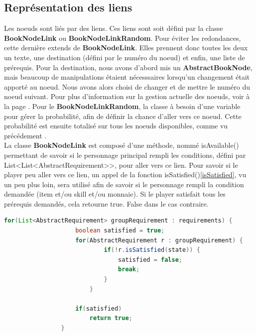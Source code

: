 		\subsection{Représentation des liens}
			Les noeuds sont liés par des liens. Ces liens sont soit défini par la classe \textbf{BookNodeLink} ou \textbf{BookNodeLinkRandom}. Pour éviter les redondances, cette dernière extends de \textbf{BookNodeLink}. Elles prennent donc toutes les deux un texte, une destination (défini par le numéro du noeud) et enfin, une liste de prérequis.  Pour la destination, nous avons d'abord mis un \textbf{AbstractBookNode}, mais beaucoup de manipulations étaient nécesssaires lorsqu'un changement était apporté au noeud. Nous avons alors choisi de changer et de mettre le numéro du noeud suivant. Pour plus d'information sur la gestion actuelle des noeuds, voir  à la page \pageref{book}.
			Pour le \textbf{BookNodeLinkRandom}, la classe à besoin d'une variable pour gérer la probabilité, afin de définir la chance d'aller vers ce noeud. Cette probabilité est ensuite totalisé sur tous les noeuds disponibles, comme vu précédement .\\
			La classe \textbf{BookNodeLink} est composé d'une méthode, nommé isAvailable() permettant de savoir si le personnage principal rempli les conditions, défini par List<List<AbstractRequirement>>, pour aller vers ce lien. Pour savoir si le player peu aller vers ce lien, un appel de la fonction isSatisfied()\ref{isSatisfied}, vu un peu plus loin, sera utilisé afin de savoir si le personnage rempli la condition demandée (item et/ou skill et/ou monnaie). Si le player satisfait tous les prérequis demandés, cela retourne true. False dans le cas contraire.

			\begin{lstlisting}[gobble=12, language=java, caption=exemple de isAvailable(), label=isAvailable]
				for(List<AbstractRequirement> groupRequirement : requirements) {
					boolean satisfied = true;
					for(AbstractRequirement r : groupRequirement) {
							if(!r.isSatisfied(state)) {
								satisfied = false;
								break;
							}
						}

					if(satisfied)
						return true;
				}
			\end{lstlisting}


